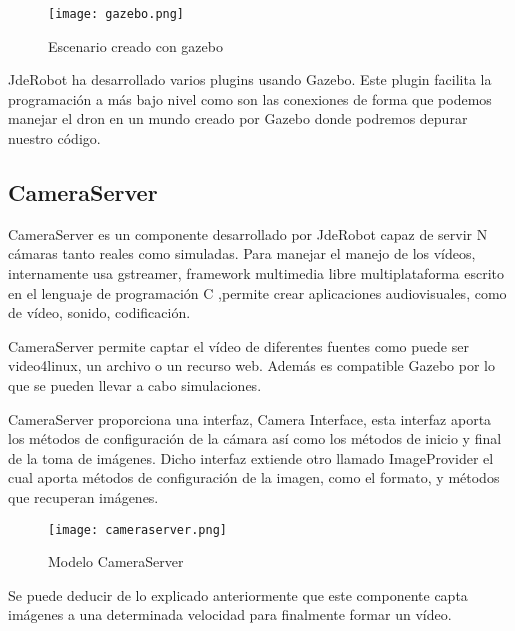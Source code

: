 \begin{figure}[H]
    \centering
    \texttt{[image: gazebo.png]}
    \caption{Escenario creado con gazebo}
\end{figure}

JdeRobot ha desarrollado varios plugins usando Gazebo. Este plugin facilita la programación a más bajo nivel como son las conexiones de forma que podemos manejar el dron en un mundo creado por Gazebo donde podremos depurar nuestro código.


\subsection{CameraServer}

CameraServer es un componente desarrollado por JdeRobot capaz de servir N cámaras tanto reales como simuladas. Para manejar el manejo de los vídeos, internamente usa gstreamer, framework multimedia libre multiplataforma escrito en el lenguaje de programación C ,permite crear aplicaciones audiovisuales, como de vídeo, sonido, codificación.

CameraServer permite captar el vídeo de diferentes fuentes como puede ser video4linux, un archivo o un recurso web. Además es compatible Gazebo por lo que se pueden llevar a cabo simulaciones.

CameraServer proporciona una interfaz, Camera Interface, esta interfaz aporta los métodos de configuración de la cámara así como los métodos de inicio y final de la toma de imágenes. Dicho interfaz extiende otro llamado ImageProvider el cual aporta métodos de configuración de la imagen, como el formato, y métodos que recuperan imágenes. 

\begin{figure}[H]
    \centering
    \texttt{[image: cameraserver.png]}
    \caption{Modelo CameraServer}
\end{figure}

Se puede deducir de lo explicado anteriormente que este componente capta imágenes a una determinada velocidad para finalmente formar un vídeo.


